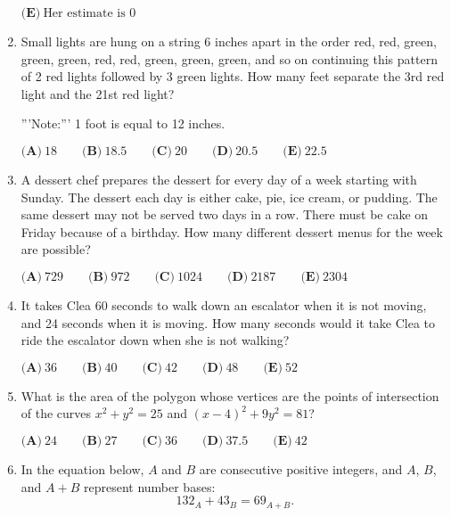 \documentclass{article}
\begin{document}
\begin{enumerate}[label=\arabic*., itemsep=0.5em]
\(\textbf{(E)}\ \text{Her estimate is 0}\)\par \vspace{0.5em}\item Small lights are hung on a string 6 inches apart in the order red, red, green, green, green, red, red, green, green, green, and so on continuing this pattern of 2 red lights followed by 3 green lights. How many feet separate the 3rd red light and the 21st red light?

'''Note:''' 1 foot is equal to 12 inches.

\(\textbf{(A)}\ 18\qquad\textbf{(B)}\ 18.5\qquad\textbf{(C)}\ 20\qquad\textbf{(D)}\ 20.5\qquad\textbf{(E)}\ 22.5 \)\par \vspace{0.5em}\item A dessert chef prepares the dessert for every day of a week starting with Sunday. The dessert each day is either cake, pie, ice cream, or pudding. The same dessert may not be served two days in a row. There must be cake on Friday because of a birthday. How many different dessert menus for the week are possible?

\(\textbf{(A)}\ 729\qquad\textbf{(B)}\ 972\qquad\textbf{(C)}\ 1024\qquad\textbf{(D)}\ 2187\qquad\textbf{(E)}\ 2304 \)\par \vspace{0.5em}\item It takes Clea 60 seconds to walk down an escalator when it is not moving, and 24 seconds when it is moving. How many seconds would it take Clea to ride the escalator down when she is not walking?

\(\textbf{(A)}\ 36\qquad\textbf{(B)}\ 40\qquad\textbf{(C)}\ 42\qquad\textbf{(D)}\ 48\qquad\textbf{(E)}\ 52 \)\par \vspace{0.5em}\item What is the area of the polygon whose vertices are the points of intersection of the curves \(x^2 + y^2 =25\) and \((x-4)^2 + 9y^2 = 81\)?

\(\textbf{(A)}\ 24\qquad\textbf{(B)}\ 27\qquad\textbf{(C)}\ 36\qquad\textbf{(D)}\ 37.5\qquad\textbf{(E)}\ 42\)\par \vspace{0.5em}\item In the equation below, \(A\) and \(B\) are consecutive positive integers, and \(A\), \(B\), and \(A+B\) represent number bases: 
\begin{equation*}
132_A+43_B=69_{A+B}.
\end{equation*}


\end{enumerate}
\end{document}
